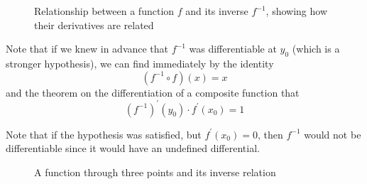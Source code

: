 \begin{theorem}
\begin{figure}[H]
      \caption{Relationship between a function $f$ and its inverse $f^{-1}$, showing how their derivatives are related}
      \label{fig:function-inverse}
    \end{figure}

    Note that if we knew in advance that $f^{-1}$ was differentiable at $y_0$ (which is a stronger hypothesis), we can find immediately by the identity 
    \[(f^{-1} \circ f) (x) = x\]  
    and the theorem on the differentiation of a composite function that
    \[(f^{-1})^\prime (y_0) \cdot f^\prime (x_0) = 1\]
  \end{theorem}

  Note that if the hypothesis was satisfied, but $f^\prime (x_0) = 0$, then $f^{-1}$ would not be differentiable since it would have an undefined differential. 

  \begin{figure}[H]
    \centering 
    \caption{A function through three points and its inverse relation}
    \label{fig:three-point-function-inverse}
  \end{figure}

